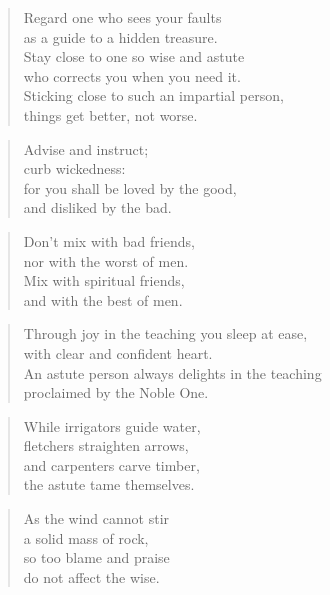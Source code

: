 \documentclass[12pt,openany]{book}%
\begin{document}
\begin{verse}%
Regard one who sees your faults \\
as a guide to a hidden treasure. \\
Stay close to one so wise and astute \\
who corrects you when you need it. \\
Sticking close to such an impartial person, \\
things get better, not worse. 

%
\end{verse}

\begin{verse}%
Advise and instruct; \\
curb wickedness: \\
for you shall be loved by the good, \\
and disliked by the bad. 

%
\end{verse}

\begin{verse}%
Don’t mix with bad friends, \\
nor with the worst of men. \\
Mix with spiritual friends, \\
and with the best of men. 

%
\end{verse}

\begin{verse}%
Through joy in the teaching you sleep at ease, \\
with clear and confident heart. \\
An astute person always delights in the teaching \\
proclaimed by the Noble One. 

%
\end{verse}

\begin{verse}%
While irrigators guide water, \\
fletchers straighten arrows, \\
and carpenters carve timber, \\
the astute tame themselves. 

%
\end{verse}

\begin{verse}%
As the wind cannot stir \\
a solid mass of rock, \\
so too blame and praise \\
do not affect the wise. 

%
\end{verse}
\end{document}
